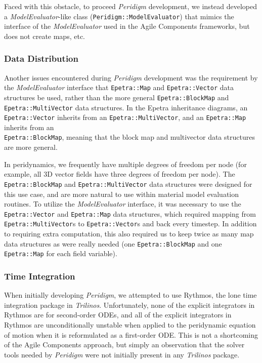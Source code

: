 \documentclass[10pt]{article}
\theoremstyle{plain}
\theoremstyle{definition}
\theoremstyle{remark}
\numberwithin{equation}{section}
\begin{document}
Faced with this obstacle, to proceed \emph{Peridigm} development, we instead developed a \emph{ModelEvaluator}-like class (\verb"Peridigm::ModelEvaluator") that mimics the interface of the \emph{ModelEvaluator} used in the Agile Components frameworks, but does not create maps, etc.

\subsubsection{Data Distribution}

Another issues encountered during \emph{Peridigm} development was the requirement by the \emph{ModelEvaluator} interface that \verb"Epetra::Map" and \verb"Epetra::Vector" data structures be used, rather than the more general \verb"Epetra::BlockMap" and \verb"Epetra::MultiVector" data structures. In the Epetra inheritance diagrams, an \verb"Epetra::Vector" inherits from an \verb"Epetra::MultiVector", and an \verb"Epetra::Map" inherits from an \\ \verb"Epetra::BlockMap", meaning that the block map and multivector data structures are more general.

In peridynamics, we frequently have multiple degrees of freedom per node (for example, all 3D vector fields have three degrees of freedom per node). The \verb"Epetra::BlockMap" and \verb"Epetra::MultiVector" data structures were designed for this use case, and are more natural to use within material model evaluation routines. To utilize the \emph{ModelEvaluator} interface, it was necessary to use the \verb"Epetra::Vector" and \verb"Epetra::Map" data structures, which required mapping from \verb"Epetra::MultiVector"s to \verb"Epetra::Vector"s and back every timestep. In addition to requiring extra computation, this also required us to keep twice as many map data structures as were really needed (one \verb"Epetra::BlockMap" and one \verb"Epetra::Map" for each field variable).

\subsubsection{Time Integration}

When initially developing \emph{Peridigm}, we attempted to use Rythmos, the lone time integration package in \emph{Trilinos}. Unfortunately, none of the explicit integrators in Rythmos are for second-order ODEs, and all of the explicit integrators in Rythmos are unconditionally unstable when applied to the peridynamic equation of motion when it is reformulated as a first-order ODE. This is not a shortcoming of the Agile Components approach, but simply an observation that the solver tools needed by \emph{Peridigm} were not initially present in any \emph{Trilinos} package.
\end{document}
